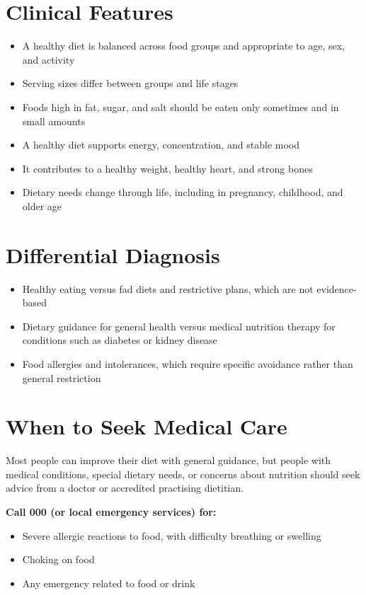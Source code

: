 \section*{Clinical Features}
\begin{itemize}
    \item A healthy diet is balanced across food groups and appropriate to age, sex, and activity
    \item Serving sizes differ between groups and life stages
    \item Foods high in fat, sugar, and salt should be eaten only sometimes and in small amounts
    \item A healthy diet supports energy, concentration, and stable mood
    \item It contributes to a healthy weight, healthy heart, and strong bones
    \item Dietary needs change through life, including in pregnancy, childhood, and older age
\end{itemize}

\section*{Differential Diagnosis}
\begin{itemize}
    \item Healthy eating versus fad diets and restrictive plans, which are not evidence-based
    \item Dietary guidance for general health versus medical nutrition therapy for conditions such as diabetes or kidney disease
    \item Food allergies and intolerances, which require specific avoidance rather than general restriction
\end{itemize}

\section*{When to Seek Medical Care}
Most people can improve their diet with general guidance, but people with medical conditions, special dietary needs, or concerns about nutrition should seek advice from a doctor or accredited practising dietitian.

\textbf{Call 000 (or local emergency services) for:}
\begin{itemize}
    \item Severe allergic reactions to food, with difficulty breathing or swelling
    \item Choking on food
    \item Any emergency related to food or drink
\end{itemize}

